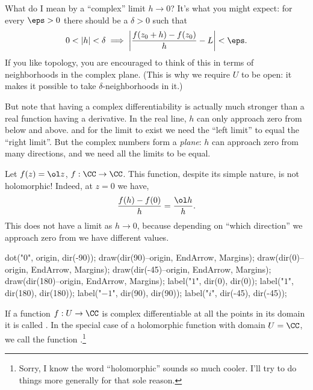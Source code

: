 What do I mean by a ``complex'' limit $h \to 0$?
It's what you might expect: for every $\eps > 0$ there should be a $\delta > 0$
such that 
\[ 0 < \left\lvert h \right\rvert < \delta
	\implies
	\left\lvert \frac{f(z_0+h)-f(z_0)}{h} - L \right\rvert < \eps. \]
If you like topology, you are encouraged to think of this in terms of neighborhoods in the complex plane.
(This is why we require $U$ to be open: it makes it possible to take $\delta$-neighborhoods in it.)

But note that having a complex differentiability is actually much stronger
than a real function having a derivative.
In the real line, $h$ can only approach zero from below and above.
and for the limit to exist we need the ``left limit'' to equal the ``right limit''.
But the complex numbers form a \emph{plane}: $h$ can approach zero
from many directions, and we need all the limits to be equal.

\begin{example}
	Let $f(z) = \ol z$, $f : \CC \to \CC$.
	This function, despite its simple nature, is not holomorphic!
	Indeed, at $z=0$ we have,
	\[ \frac{f(h)-f(0)}{h} = \frac{\ol h}{h}. \]
	This does not have a limit as $h \to 0$, because depending
	on ``which direction'' we approach zero from we have different values.
	\begin{center}
		\begin{asy}
			dot("$0$", origin, dir(-90));
			draw(dir(90)--origin, EndArrow, Margins);
			draw(dir(0)--origin, EndArrow, Margins);
			draw(dir(-45)--origin, EndArrow, Margins);
			draw(dir(180)--origin, EndArrow, Margins);
			label("$1$", dir(0), dir(0));
			label("$1$", dir(180), dir(180));
			label("$-1$", dir(90), dir(90));
			label("$i$", dir(-45), dir(-45));
		\end{asy}
	\end{center}
\end{example}

If a function $f : U \to \CC$ is complex differentiable
at all the points in its domain it is called .
In the special case of a holomorphic function with domain $U = \CC$,
we call the function .\footnote{Sorry, I know the word ``holomorphic'' sounds so much cooler. I'll try to do things more generally for that sole reason.}


